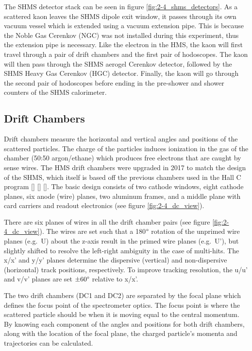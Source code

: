 \documentclass[
]{report}
\begin{document}


The SHMS detector stack can be seen in figure
\ref{fig:2-4_shms_detectors}. As a scattered kaon leaves the SHMS dipole
exit window, it passes through its own vacuum vessel which is extended
using a vacuum extension pipe. This is because the Noble Gas Cerenkov
(NGC) was not installed during this experiment, thus the extension pipe
is necessary. Like the electron in the HMS, the kaon will first travel
through a pair of drift chambers and the first pair of hodoscopes. The
kaon will then pass through the SHMS aerogel Cerenkov detector, followed
by the SHMS Heavy Gas Cerenkov (HGC) detector. Finally, the kaon will go
through the second pair of hodoscopes before ending in the pre-shower
and shower counters of the SHMS calorimeter.

\hypertarget{drift-chambers}{%
\subsection{Drift Chambers}\label{drift-chambers}}

Drift chambers measure the horizontal and vertical angles and positions
of the scattered particles. The charge of the particles induces
ionization in the gas of the chamber (50:50 argon/ethane) which produces
free electrons that are caught by sense wires. The HMS drift chambers
were upgraded in 2017 to match the design of the SHMS, which itself is
based off the previous chambers used in the Hall C program
{[}\cite{pandey_status_2017}{]} {[}\cite{tang_hall_2017}{]}
{[}\cite{christy_hall_2016}{]}. The basic design consists of two cathode
windows, eight cathode planes, six anode (wire) planes, two aluminum
frames, and a middle plane with card carriers and readout electronics
(see figure \ref{fig:2-4_dc_view}).

There are six planes of wires in all the drift chamber pairs (see figure
\ref{fig:2-4_dc_view}). The wires are set such that a 180\(\degree\)
rotation of the unprimed wire planes (e.g.~U) about the z-axis result in
the primed wire planes (e.g.~U'), but slightly shifted to resolve the
left-right ambiguity in the case of multi-hits. The x/x' and y/y' planes
determine the dispersive (vertical) and non-dispersive (horizontal)
track positions, respectively. To improve tracking resolution, the u/u'
and v/v' planes are set \(\pm60\degree\) relative to x/x'.



The two drift chambers (DC1 and DC2) are separated by the focal plane
which defines the focus point of the spectrometer optics. The focus
point is where the scattered particle should be when it is moving equal
to the central momentum. By knowing each component of the angles and
positions for both drift chambers, along with the location of the focal
plane, the charged particle's momenta and trajectories can be
calculated.
\end{document}
